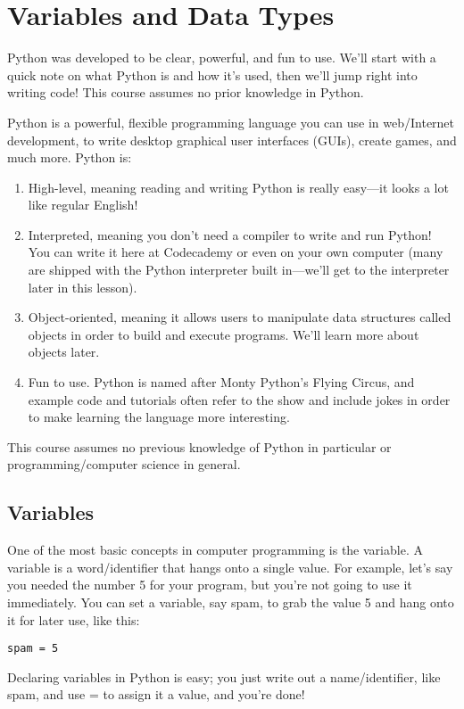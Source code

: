 \documentclass[12pt,a4paper,final,twoside,onecolumn,titlepage]{book}
\begin{document}
\section{Variables and Data Types}
Python was developed to be clear, powerful, and fun to use. We'll start with a quick note on what Python is and how it's used, then we'll jump right into writing code! This course assumes no prior knowledge in Python.

Python is a powerful, flexible programming language you can use in web/Internet development, to write desktop graphical user interfaces (GUIs), create games, and much more. Python is:
\begin{enumerate}
\item High-level, meaning reading and writing Python is really easy—it looks a lot like regular English!
\item Interpreted, meaning you don't need a compiler to write and run Python! You can write it here at Codecademy or even on your own computer (many are shipped with the Python interpreter built in—we'll get to the interpreter later in this lesson).
\item Object-oriented, meaning it allows users to manipulate data structures called objects in order to build and execute programs. We'll learn more about objects later.
\item Fun to use. Python is named after Monty Python's Flying Circus, and example code and tutorials often refer to the show and include jokes in order to make learning the language more interesting.
\end{enumerate}
This course assumes no previous knowledge of Python in particular or programming/computer science in general.

\subsection{Variables}
One of the most basic concepts in computer programming is the variable. A variable is a word/identifier that hangs onto a single value. For example, let's say you needed the number 5 for your program, but you're not going to use it immediately. You can set a variable, say spam, to grab the value 5 and hang onto it for later use, like this:
\begin{lstlisting}
spam = 5
\end{lstlisting}
Declaring variables in Python is easy; you just write out a name/identifier, like spam, and use = to assign it a value, and you're done!
\end{document}
